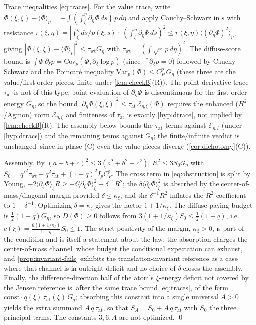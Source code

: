 \documentclass[reqno,final,11pt]{amsart}
\theoremstyle{plain}
\theoremstyle{definition}
\theoremstyle{remark}
\begin{document}
Trace inequalities \eqref{eq:traces}. For the value trace, write
$\Phi(\xi,\xi)-\langle\Phi\rangle_p=-\int(\int_\xi^\eta\partial_\eta\Phi\,ds)\,p\,d\eta$
and apply Cauchy--Schwarz in $s$ with resistance
$r(\xi,\eta)=|\int_\xi^\eta ds/p(\xi,s)|$:
$(\int_\xi^\eta\partial_\eta\Phi\,ds)^2\le r(\xi,\eta)\langle(\partial_\eta\Phi)^2\rangle_p$,
giving $|\Phi(\xi,\xi)-\langle\Phi\rangle_p|^2\le\tau_{\mathrm{wt}}G_\eta$
with $\tau_{\mathrm{wt}}=(\int\sqrt r\,p\,d\eta)^2$. The diffuse-score bound
is $\int\Phi\,\partial_\xi p=\mathrm{Cov}_p(\Phi,\partial_\xi\log p)$ (since
$\int\partial_\xi p=0$) followed by Cauchy--Schwarz and the Poincar\'e
inequality $\mathrm{Var}_p(\Phi)\le C^p_P\,G_\eta$ (these three are the
value/first-order pieces, finite under \cref{lem:checkB}(R)). The
point-derivative trace $\tau_{\mathrm{at}}$ is not of this type: point
evaluation of $\partial_\eta\Phi$ is discontinuous for the first-order energy
$G_\eta$, so the bound $|\partial_\eta\Phi(\xi,\xi)|^2\le\tau_{\mathrm{at}}\,
\mathcal E_{\eta,\xi}(\Phi)$ requires the enhanced ($H^2$/Agmon) norm
$\mathcal E_{\eta,\xi}$ and finiteness of $\tau_{\mathrm{at}}$ is exactly
\cref{hyp:dtrace}, not implied by \cref{lem:checkB}(R). The
assembly below bounds the $\tau_{\mathrm{at}}$ terms against
$\mathcal E_{\eta,\xi}$ (under \cref{hyp:dtrace}) and the remaining terms
against $G_\eta$; the finite/infinite verdict is unchanged, since in phase (C)
even the value pieces diverge (\cref{cor:dichotomy}(C)).

Assembly. By $(a+b+c)^2\le3(a^2+b^2+c^2)$, $R^2\le3S_0G_\eta$ with
$S_0=q'^2\tau_{\mathrm{wt}}+q^2\tau_{\mathrm{at}}+(1-q)^2I_pC^p_P$. The
cross term in \eqref{eq:obstruction} is split by Young,
$-2\langle\partial_\xi\Phi\rangle_\xi R\ge-\delta\langle\partial_\xi\Phi\rangle_\xi^2-\delta^{-1}R^2$;
the $\delta\langle\partial_\xi\Phi\rangle_\xi^2$ is absorbed by the
center-of-mass/diagonal margin provided $\delta\le\kappa_\xi$, and the
$\delta^{-1}R^2$ inflates the $R^2$-coefficient to $1+\delta^{-1}$. Optimizing
$\delta=\kappa_\xi$ gives the factor $1+1/\kappa_\xi$. The diffuse paying
budget is $\tfrac12(1-q)G_\eta$, so $D(\Phi)\ge0$ follows from
$3(1+1/\kappa_\xi)S_0\le\tfrac12(1-q)$, i.e.
$c(\xi)=\tfrac{6(1+1/\kappa_\xi)}{1-q}S_0\le1$. The strict positivity of
the margin, $\kappa_\xi>0$, is part of the condition and is itself a
statement about the law: the absorption charges the center-of-mass
channel, whose budget the conditional expectation can exhaust, and
\cref{prop:invariant-fails} exhibits the translation-invariant reference
as a case where that channel is in outright deficit and no choice of
$\delta$ closes the assembly. Finally, the
difference-direction half of the atom's $\xi$-energy deficit not covered by the
Jensen reference is, after the same trace bound
\eqref{eq:traces}, of the form $\mathrm{const}\cdot q(\xi)\,\tau_{\mathrm{at}}(\xi)\,
G_\eta$; absorbing this constant into a single universal $A>0$ yields the extra
summand $A\,q\,\tau_{\mathrm{at}}$, so that $S_A=S_0+A\,q\,\tau_{\mathrm{at}}$
with $S_0$ the three principal terms. The constants $3,6,A$ are not
optimized. \qed
\end{document}
